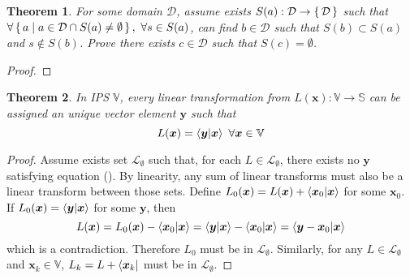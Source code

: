 \documentclass{article}
\newcommand{\B}[1]{\boldsymbol{#1}}
\newtheorem{theorem}{Theorem}[section]
\theoremstyle{definition}
\theoremstyle{remark}
\begin{document}
\begin{theorem}
  For some domain $\mathcal{D}$, assume exists $S(a) : \mathcal{D} \to \set{\mathcal{D}}$ such that
  $\forall  \set{a | a \in \mathcal{D} \cap  S(a) \neq \emptyset} , ~ \forall s \in S(a) $, can find $b \in \mathcal{D}$ such that
  $S(b) \subset S(a)$ and $s \notin S(b)$. Prove there exists $c \in \mathcal{D}$ such that $S(c) = \emptyset$.
\end{theorem}

\begin{proof}
  
\end{proof}

\begin{theorem}
  In IPS $\mathbb{V}$, every linear transformation from $L(\B{x}) : \mathbb{V} \to \mathbb{S}$ can be 
  assigned an unique vector element $\B{y}$ such that 
  \begin{equation}
    L(\B{x}) = \braket{\B{y}|\B{x}} ~ \forall \B{x} \in \mathbb{V} \label{eq:linearMapCompleteness}
  \end{equation}
\end{theorem}

\begin{proof}
  Assume exists set $\mathcal{L}_\emptyset$ such that, for each $L \in \mathcal{L}_\emptyset$,
  there exists no $\B{y}$ satisfying equation (). By linearity,
  any sum of linear transforms must also be a linear transform between those sets. Define 
  $L_0(\B{x}) = L(\B{x}) + \braket{\B{x}_0|\B{x}}$ for some $\B{x}_0$. If $L_0(\B{x}) = \braket{\B{y}|\B{x}}$
  for some $\B{y}$, then 
  \begin{equation}
    L(\B{x}) = L_0(\B{x}) - \braket{\B{x}_0|\B{x}} = \braket{\B{y}|\B{x}} - \braket{\B{x}_0|\B{x}} = \braket{\B{y} - \B{x}_0|\B{x}}
  \end{equation}
  which is a contradiction. Therefore $L_0$ must be in $\mathcal{L}_\emptyset$. Similarly, for 
  any $L \in \mathcal{L}_\emptyset$ and $\B{x}_k \in \mathbb{V}$,
  $L_k = L + \bra{\B{x}_k} $ must be in $\mathcal{L}_\emptyset$.
\end{proof}


  
\end{document}
